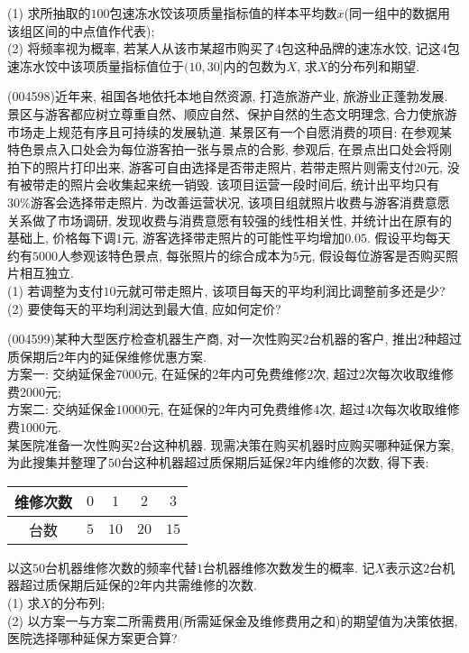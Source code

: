 (1) 求所抽取的$100$包速冻水饺该项质量指标值的样本平均数$\overline x$(同一组中的数据用该组区间的中点值作代表);\\
(2) 将频率视为概率, 若某人从该市某超市购买了$4$包这种品牌的速冻水饺, 记这$4$包速冻水饺中该项质量指标值位于$(10,30]$内的包数为$X$, 求$X$的分布列和期望.
\item (004598)近年来, 祖国各地依托本地自然资源, 打造旅游产业, 旅游业正蓬勃发展. 景区与游客都应树立尊重自然、顺应自然、保护自然的生态文明理念, 合力使旅游市场走上规范有序且可持续的发展轨道. 某景区有一个自愿消费的项目: 在参观某特色景点入口处会为每位游客拍一张与景点的合影, 参观后, 在景点出口处会将刚拍下的照片打印出来, 游客可自由选择是否带走照片, 若带走照片则需支付$20$元, 没有被带走的照片会收集起来统一销毁. 该项目运营一段时间后, 统计出平均只有$30\%$游客会选择带走照片. 为改善运营状况, 该项目组就照片收费与游客消费意愿关系做了市场调研, 发现收费与消费意愿有较强的线性相关性, 并统计出在原有的基础上, 价格每下调$1$元, 游客选择带走照片的可能性平均增加$0.05$. 假设平均每天约有$5000$人参观该特色景点, 每张照片的综合成本为$5$元, 假设每位游客是否购买照片相互独立.\\
(1) 若调整为支付$10$元就可带走照片, 该项目每天的平均利润比调整前多还是少?\\
(2) 要使每天的平均利润达到最大值, 应如何定价?
\item (004599)某种大型医疗检查机器生产商, 对一次性购买$2$台机器的客户, 推出$2$种超过质保期后$2$年内的延保维修优惠方案.\\
方案一: 交纳延保金$7000$元, 在延保的$2$年内可免费维修$2$次, 超过$2$次每次收取维修费$2000$元;\\
方案二: 交纳延保金$10000$元, 在延保的$2$年内可免费维修$4$次, 超过$4$次每次收取维修费$1000$元.\\
某医院准备一次性购买$2$台这种机器. 现需决策在购买机器时应购买哪种延保方案, 为此搜集并整理了$50$台这种机器超过质保期后延保$2$年内维修的次数, 得下表:
\begin{center}
    \begin{tabular}{|c|c|c|c|c|}
        \hline
        维修次数 & $0$ & $1$ & $2$ & $3$\\ \hline
        台数 & $5$ & $10$ & $20$ & $15$\\ \hline
    \end{tabular}
\end{center}
以这$50$台机器维修次数的频率代替$1$台机器维修次数发生的概率. 记$X$表示这$2$台机器超过质保期后延保的$2$年内共需维修的次数.\\
(1) 求$X$的分布列;\\
(2) 以方案一与方案二所需费用(所需延保金及维修费用之和)的期望值为决策依据, 医院选择哪种延保方案更合算?
